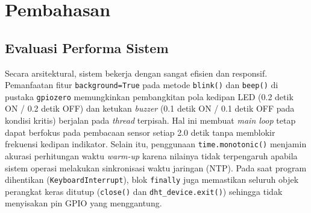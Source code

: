 \documentclass[12pt, a4paper]{article}
\begin{document}
\section{Pembahasan}
\subsection{Evaluasi Performa Sistem}
Secara arsitektural, sistem bekerja dengan sangat efisien dan responsif. Pemanfaatan fitur \texttt{background=True} pada 
metode \texttt{blink()} dan \texttt{beep()} di pustaka \texttt{gpiozero} memungkinkan pembangkitan pola kedipan LED (0.2 detik ON / 0.2 detik OFF) dan ketukan \textit{buzzer} (0.1 detik ON / 0.1 detik OFF pada kondisi kritis) berjalan pada \textit{thread} terpisah. Hal ini 
membuat \textit{main loop} tetap dapat berfokus pada pembacaan sensor setiap 2.0 detik tanpa memblokir frekuensi kedipan indikator.
 Selain itu, penggunaan \texttt{time.monotonic()} menjamin akurasi perhitungan waktu \textit{warm-up} karena nilainya tidak 
 terpengaruh apabila sistem operasi melakukan sinkronisasi waktu jaringan (NTP). Pada saat program dihentikan 
 (\texttt{KeyboardInterrupt}), blok \texttt{finally} juga memastikan seluruh objek perangkat keras ditutup (\texttt{close()} 
 dan \texttt{dht\_device.exit()}) sehingga tidak menyisakan pin GPIO yang menggantung.
\end{document}
